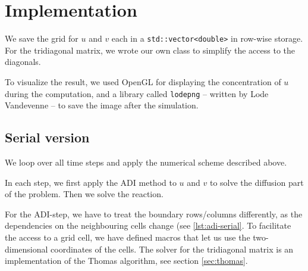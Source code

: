 \documentclass[a4paper]{article}
\begin{document}
\section{Implementation}

We save the grid for $u$ and $v$ each in a \verb+std::vector<double>+ in row-wise storage.
For the tridiagonal matrix, we wrote our own class to simplify the access to the diagonals.

To visualize the result, we used OpenGL for displaying the concentration of $u$ during the computation, and a library called \verb+lodepng+ -- written by Lode Vandevenne -- to save the image after the simulation.

\subsection{Serial version}

We loop over all time steps and apply the numerical scheme described above.



In each step, we first apply the ADI method to $u$ and $v$ to solve the diffusion part of the problem.
Then we solve the reaction.

For the ADI-step, we have to treat the boundary rows/columns differently, as the dependencies on the neighbouring cells change (see \ref{lst:adi-serial}.
To facilitate the access to a grid cell, we have defined macros that let us use the two-dimensional coordinates of the cells.
The solver for the tridiagonal matrix is an implementation of the Thomas algorithm, see section \ref{sec:thomas}.
\end{document}
